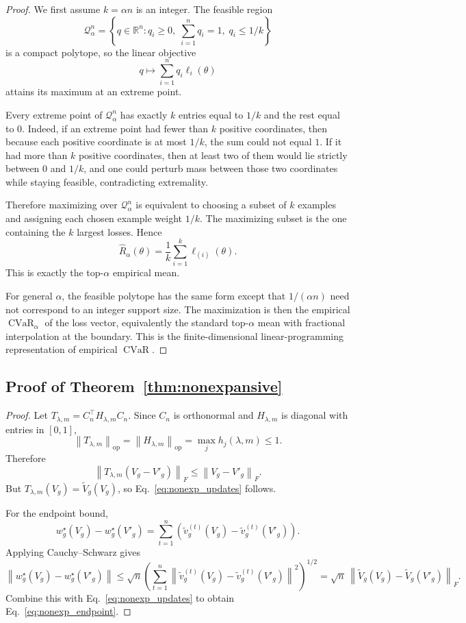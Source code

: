 \documentclass{article}
\newcommand{\RR}{\mathbb{R}}
\newcommand{\cQ}{\mathcal{Q}}
\newcommand{\CVaR}{\operatorname{CVaR}}
\newcommand{\norm}[1]{\left\lVert #1 \right\rVert}
\newcommand{\paren}[1]{\left( #1 \right)}
\newcommand{\braces}[1]{\left\{ #1 \right\}}
\newcommand{\loss}{\ell}
\begin{document}
\begin{proof}
We first assume \(k=\alpha n\) is an integer. The feasible region
\[
\cQ_\alpha^n
=
\braces{
q\in\RR^n :
q_i\ge 0,\;
\sum_{i=1}^{n} q_i = 1,\;
q_i \le 1/k
}
\]
is a compact polytope, so the linear objective
\[
q \mapsto \sum_{i=1}^{n} q_i \loss_i(\theta)
\]
attains its maximum at an extreme point.

Every extreme point of \(\cQ_\alpha^n\) has exactly \(k\) entries equal to \(1/k\) and the rest equal to \(0\). Indeed, if an extreme point had fewer than \(k\) positive coordinates, then because each positive coordinate is at most \(1/k\), the sum could not equal \(1\). If it had more than \(k\) positive coordinates, then at least two of them would lie strictly between \(0\) and \(1/k\), and one could perturb mass between those two coordinates while staying feasible, contradicting extremality.

Therefore maximizing over \(\cQ_\alpha^n\) is equivalent to choosing a subset of \(k\) examples and assigning each chosen example weight \(1/k\). The maximizing subset is the one containing the \(k\) largest losses. Hence
\[
\widehat R_\alpha(\theta)
=
\frac{1}{k}\sum_{i=1}^{k} \loss_{(i)}(\theta).
\]
This is exactly the top-\(\alpha\) empirical mean.

For general \(\alpha\), the feasible polytope has the same form except that \(1/(\alpha n)\) need not correspond to an integer support size. The maximization is then the empirical \(\CVaR_\alpha\) of the loss vector, equivalently the standard top-\(\alpha\) mean with fractional interpolation at the boundary. This is the finite-dimensional linear-programming representation of empirical \(\CVaR\).
\end{proof}

\subsection{Proof of Theorem~\ref{thm:nonexpansive}}

\begin{proof}
Let \(T_{\lambda,m}=C_n^\top H_{\lambda,m} C_n\). Since \(C_n\) is orthonormal and \(H_{\lambda,m}\) is diagonal with entries in \([0,1]\),
\[
\norm{T_{\lambda,m}}_{\mathrm{op}}
=
\norm{H_{\lambda,m}}_{\mathrm{op}}
=
\max_j h_j(\lambda,m)
\le
1.
\]
Therefore
\[
\norm{T_{\lambda,m}(V_g - V'_g)}_F
\le
\norm{V_g - V'_g}_F.
\]
But \(T_{\lambda,m}(V_g)=\widetilde V_g(V_g)\), so Eq.~\eqref{eq:nonexp_updates} follows.

For the endpoint bound,
\[
w_g^\star(V_g) - w_g^\star(V'_g)
=
\sum_{t=1}^{n}\paren{\widetilde v_g^{(t)}(V_g) - \widetilde v_g^{(t)}(V'_g)}.
\]
Applying Cauchy--Schwarz gives
\[
\norm{w_g^\star(V_g) - w_g^\star(V'_g)}
\le
\sqrt{n}
\left(
\sum_{t=1}^{n}
\norm{\widetilde v_g^{(t)}(V_g) - \widetilde v_g^{(t)}(V'_g)}^2
\right)^{1/2}
=
\sqrt{n}\,\norm{\widetilde V_g(V_g) - \widetilde V_g(V'_g)}_F.
\]
Combine this with Eq.~\eqref{eq:nonexp_updates} to obtain Eq.~\eqref{eq:nonexp_endpoint}.
\end{proof}
\end{document}
